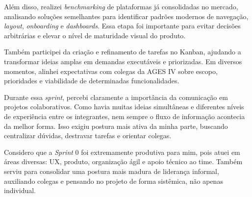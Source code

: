 Além disso, realizei \textit{benchmarking} de plataformas já consolidadas no mercado, analisando soluções semelhantes para identificar padrões modernos de navegação, \textit{layout}, \textit{onboarding} e \textit{dashboards}. Essa etapa foi importante para evitar decisões arbitrárias e elevar o nível de maturidade visual do produto.

Também participei da criação e refinamento de tarefas no Kanban, ajudando a transformar ideias amplas em demandas executáveis e priorizadas. Em diversos momentos, alinhei expectativas com colegas da \ac{AGES} IV sobre escopo, prioridades e viabilidade de determinadas funcionalidades.

Durante essa \textit{sprint}, percebi claramente a importância da comunicação em projetos colaborativos. Como havia muitas ideias simultâneas e diferentes níveis de experiência entre os integrantes, nem sempre o fluxo de informação acontecia da melhor forma. Isso exigiu postura mais ativa da minha parte, buscando centralizar dúvidas, destravar tarefas e orientar colegas.

Considero que a \textit{Sprint} 0 foi extremamente produtiva para mim, pois atuei em áreas diversas: \ac{UX}, produto, organização ágil e apoio técnico ao time. Também serviu para consolidar uma postura mais madura de liderança informal, auxiliando colegas e pensando no projeto de forma sistêmica, não apenas individual.

\vspace{0.5cm}
